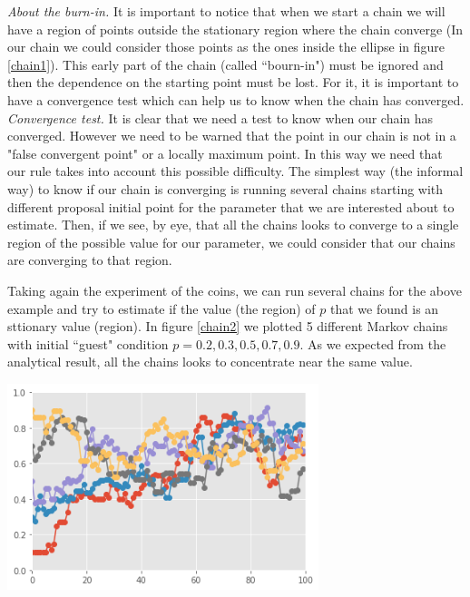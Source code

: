 \documentclass[onecolumn,           %
               showpacs,            %
               preprintnumbers,     %
               aps,                 %
               prl,          	    %
               letterpaper,             %
               superscriptaddress,      %
               nofootinbib,         %
               tightenlines,        %
               floats,floatfix      %
               ,usenatbib,
               ]{revtex4-1}
\begin{document}
\textit{About the burn-in.} It is important to notice that when we start a chain we will have a region of points outside the stationary region where the chain converge (In our chain we could consider those points as the ones inside the ellipse in figure \ref{chain1}). This early part of the chain (called ``bourn-in") must be ignored and then the dependence on the starting point must be lost. For it, it is important to have a convergence test which can help us to know when the chain has converged.\\

\textit{Convergence test.} It is clear that we need a test to know when our chain has converged. However we need to be warned that the point in our chain is not in a "false convergent point" or a locally maximum point. In this way we need that our rule takes into account this possible difficulty. The simplest way (the informal way) to know if our chain is converging is running several chains starting with different proposal initial point for the parameter that we are interested about to estimate. Then, if we see, by eye, that all the chains looks to converge to a single region of the possible value for our parameter, we could consider that our chains are converging to that region. 

 Taking again the experiment of the coins, we can run several chains for the above example and try to estimate if the value (the region) of $p$ that we found is an sttionary value (region). In figure \ref{chain2} we plotted 5 different Markov chains with initial ``guest" condition $p=0.2,0.3,0.5,0.7,0.9$. As we expected from the analytical result, all the chains looks to concentrate near the same value.

\begin{minipage}{\textwidth}
\centering
\includegraphics[height=6cm]{chain2.png}
\label{chain2}
\end{minipage}
\end{document}
